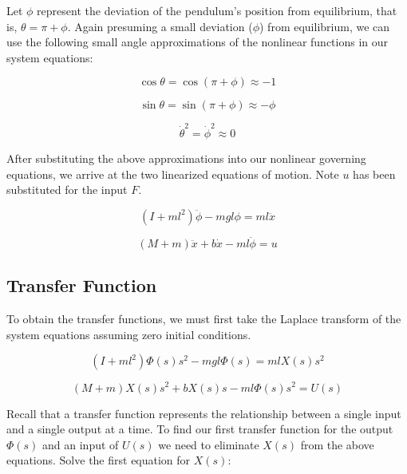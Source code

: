 \documentclass[12pt]{article}
\begin{document}
Let $\phi$ represent the deviation of the pendulum's position from equilibrium, that is, $\theta = \pi + \phi$. Again presuming a small deviation ($\phi$) from equilibrium, we can use the following small angle approximations of the nonlinear functions in our system equations:

\begin{equation}
\cos \theta = \cos(\pi + \phi) \approx -1
\end{equation}

\begin{equation}
\sin \theta = \sin(\pi + \phi) \approx -\phi
\end{equation}

\begin{equation}
\dot{\theta}^2 = \dot{\phi}^2 \approx 0
\end{equation}

After substituting the above approximations into our nonlinear governing equations, we arrive at the two linearized equations of motion. Note $u$ has been substituted for the input $F$.

\begin{equation}
(I+ml^2)\ddot{\phi} - mgl\phi = ml\ddot{x}
\end{equation}

\begin{equation}
(M+m)\ddot{x} + b\dot{x} - ml\ddot{\phi} = u
\end{equation}

\subsection{Transfer Function}

To obtain the transfer functions, we must first take the Laplace transform of the system equations assuming zero initial conditions.

\begin{equation}
(I+ml^2)\Phi(s)s^2 - mgl\Phi(s) = mlX(s)s^2
\end{equation}

\begin{equation}
(M+m)X(s)s^2 + bX(s)s - ml\Phi(s)s^2 = U(s)
\end{equation}

Recall that a transfer function represents the relationship between a single input and a single output at a time. To find our first transfer function for the output $\Phi(s)$ and an input of $U(s)$ we need to eliminate $X(s)$ from the above equations. Solve the first equation for $X(s)$:
\end{document}
